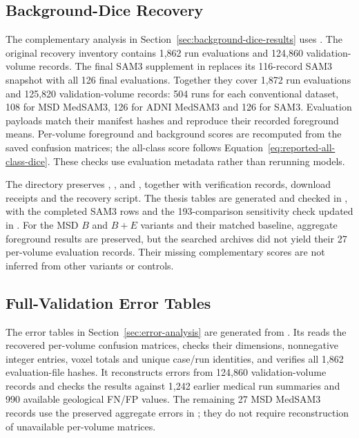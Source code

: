 \subsection{Background-Dice Recovery}
\label{sec:background-dice-evidence}

The complementary analysis in Section~\ref{sec:background-dice-results}
uses .
The original recovery inventory contains 1,862 run evaluations and
124,860 validation-volume records. The final SAM3 supplement in
 replaces its 116-record
SAM3 snapshot with all 126 final evaluations. Together they cover
1,872 run evaluations and 125,820 validation-volume records:
504 runs for each conventional dataset, 108 for MSD MedSAM3,
126 for ADNI MedSAM3 and 126 for SAM3. Evaluation payloads match
their manifest hashes and reproduce their recorded foreground means.
Per-volume foreground and background scores are recomputed from the
saved confusion matrices; the all-class score follows
Equation~\ref{eq:reported-all-class-dice}. These checks use evaluation
metadata rather than rerunning models.

The directory preserves ,
, 
and , together with verification
records, download receipts and the recovery script. The thesis tables
are generated and checked in
, with the
completed SAM3 rows and the 193-comparison sensitivity check updated in
.
For the MSD $B$ and $B+E$ variants and their matched baseline,
aggregate foreground results are preserved, but the searched archives
did not yield their 27 per-volume evaluation records. Their missing
complementary scores are not inferred from other variants or controls.

\subsection{Full-Validation Error Tables}
\label{sec:all-variant-error-evidence}

The error tables in Section~\ref{sec:error-analysis} are generated from
. Its 
reads the recovered per-volume confusion matrices, checks their dimensions,
nonnegative integer entries, voxel totals and unique case/run identities,
and verifies all 1,862 evaluation-file hashes. It reconstructs errors
from 124,860 validation-volume records and checks the results against
1,242 earlier medical run summaries and 990 available geological FN/FP
values. The remaining 27 MSD MedSAM3 records use the preserved aggregate
errors in ; they
do not require reconstruction of unavailable per-volume matrices.

